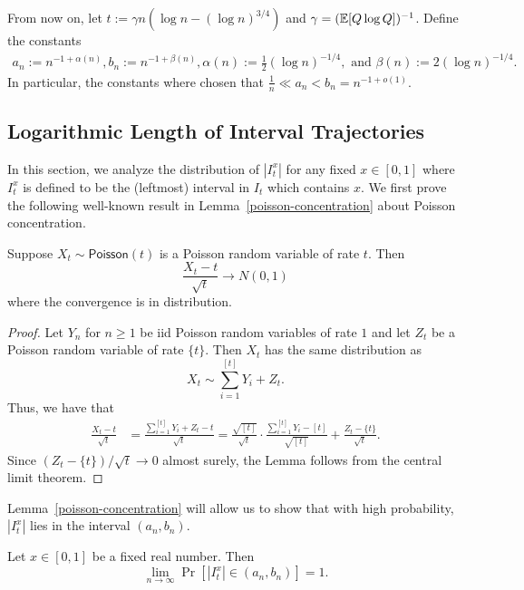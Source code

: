 \documentclass[12pt]{article}
\begin{document}
From now on, let $t := \gamma n ( \log n - (\log n)^{3/4})$ and $\gamma = (\mathbb{E}[Q \log Q])^{-1}$. Define the constants
\begin{align*}
	a_n := n^{-1 + \alpha(n)}, b_n := n^{-1 + \beta(n)},  \alpha(n) := \frac{1}{2} (\log n)^{-1/4}, \text{ and } \beta(n) := 2 (\log n)^{-1/4}.
\end{align*}
In particular, the constants where chosen that $\frac{1}{n} \ll a_n < b_n = n^{-1 + o(1)}$. 

\subsection{Logarithmic Length of Interval Trajectories}
In this section, we analyze the distribution of $|I_t^x|$ for any fixed $x \in [0, 1]$ where $I_t^x$ is defined to be the (leftmost) interval in $I_t$ which contains $x$. We first prove the following well-known result in Lemma~\ref{poisson-concentration} about Poisson concentration. 

\begin{lem} \label{poisson-concentration}
	Suppose $X_t \sim \mathsf{Poisson}(t)$ is a Poisson random variable of rate $t$. Then 
	\[
		\frac{X_t - t}{\sqrt{t}} \longrightarrow N(0, 1)
	\]
	where the convergence is in distribution. 
\end{lem}

\begin{proof}
	Let $Y_n$ for $n \geq 1$ be iid Poisson random variables of rate $1$ and let $Z_t$ be a Poisson random variable of rate $\{t\}$. Then $X_t$ has the same distribution as 
	\[
		X_t \sim \sum_{i = 1}^{[t]} Y_i + Z_t.	
	\]
	Thus, we have that 
	\begin{align*}
		\frac{X_t - t}{\sqrt{t}} & = \frac{\sum_{i = 1}^{[t]} Y_i + Z_t-t}{\sqrt{t}} = \frac{\sqrt{[t]}}{\sqrt{t}} \cdot \frac{\sum_{i = 1}^{[t]} Y_i - [t]}{\sqrt{[t]}} + \frac{Z_t - \{t\}}{\sqrt{t}}.
	\end{align*}
	Since $(Z_t - \{t\})/\sqrt{t} \to 0$ almost surely, the Lemma follows from the central limit theorem. 
\end{proof}

Lemma~\ref{poisson-concentration} will allow us to show that with high probability, $|I_t^x|$ lies in the interval $(a_n, b_n)$.

\begin{lem} \label{high-probability-YES}
	Let $x \in [0, 1]$ be a fixed real number. Then 
	\[
		\lim_{n \to \infty} \Pr [ |I_t^x| \in (a_n, b_n) ] = 1. 
	\]
\end{lem}
\end{document}
